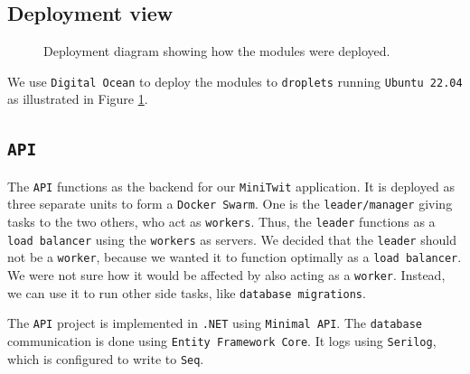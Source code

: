 \subsection{Deployment view}
\begin{figure}[H]
      \centering
      \caption{Deployment diagram showing how the modules were deployed.}
      \label{fig:deployment_diagram}
\end{figure}
We use \texttt{Digital Ocean} to deploy the modules to 
\texttt{droplets} running \texttt{Ubuntu 22.04} as 
illustrated in Figure \ref{fig:deployment_diagram}. 

\subsection{\texttt{API}}

The \texttt{API} functions as the backend for our \texttt{MiniTwit} application.
It is deployed as three separate units to form a \texttt{Docker Swarm}. 
One is the \texttt{leader/manager} giving tasks to 
the two others, who act as \texttt{workers}. 
Thus, the \texttt{leader} functions as a \texttt{load balancer} 
using the \texttt{workers} as servers.
We decided that the \texttt{leader} should not be a \texttt{worker},
because we wanted it to function optimally as a \texttt{load balancer}.
We were not sure how it would be affected by also acting as a \texttt{worker}.
Instead, we can use it to run other side tasks, like \texttt{database migrations}.

The \texttt{API} project is implemented in \texttt{.NET} using 
\texttt{Minimal API}\cite{minimalApi}.
The \texttt{database} communication is done using \texttt{Entity Framework Core}.
It logs using \texttt{Serilog}\cite{serilog}, 
which is configured to write to \texttt{Seq}\cite{seq}.

